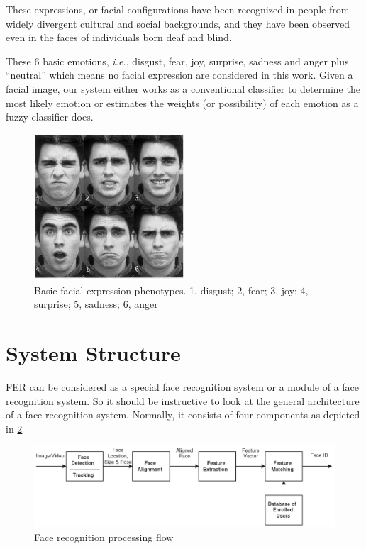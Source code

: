 \documentclass[12pt, twoside]{report}
\begin{document}
These expressions, or facial configurations have been recognized in people from widely divergent cultural and social backgrounds, and they have been observed even in the faces of individuals born deaf and blind.

These 6 basic emotions, \textit{i.e.}, disgust, fear, joy, surprise, sadness and anger plus ``neutral'' which means no facial expression are considered in this work. Given a facial image, our system either works as a conventional classifier to determine the most likely emotion or estimates the weights (or possibility) of each emotion as a fuzzy classifier does.

	\begin{figure}[h!]
    	\centering
    	\includegraphics[width=0.5\textwidth]{img/12_1.png}
    	\caption{Basic facial expression phenotypes. 1, disgust; 2, fear; 3, joy; 4, surprise; 5, sadness; 6, anger}
    	\label{fig:facialPhenotypes}
	\end{figure}

	\section{System Structure}
	FER can be considered as a special face recognition system or a module of a face recognition system. So it should be instructive to look at the general architecture of a face recognition system. Normally, it consists of four components as depicted in \ref{fig:processingFlow}

	\begin{figure}[h]
    	\centering
    	\includegraphics[width=\textwidth]{img/12_2.png}
    	\caption{Face recognition processing flow}
    	\label{fig:processingFlow}
	\end{figure}
\end{document}
